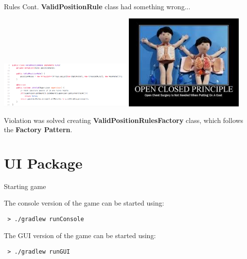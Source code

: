 \documentclass{beamer}
\begin{document}
     \begin{frame} {Rules Cont.}
     \textbf{ValidPositionRule} class had something wrong...

     \vspace{1em}

     {\includegraphics[width=0.5\textwidth]{img/validpositionrule.png}}
        \pause
     {\includegraphics[width=0.45\textwidth]{img/openclosedprinciple.jpeg}}
     \pause

     \vspace{1em}

     Violation was solved creating \textbf{ValidPositionRulesFactory} class, which follows the \textbf{Factory Pattern}.

     \end{frame}


\section{UI Package}



  \begin{frame}[fragile]{Starting game}

    The console version of the game can be started using:

    \begin{lstlisting}
 > ./gradlew runConsole
    \end{lstlisting}

    \vspace{3em}

    The GUI version of the game can be started using:

    \begin{lstlisting} 
 > ./gradlew runGUI
    \end{lstlisting}

  \end{frame}
\end{document}

